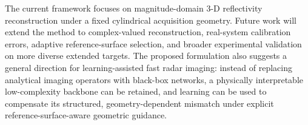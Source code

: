 \documentclass[journal]{IEEEtran}
\begin{document}
The current framework focuses on magnitude-domain 3-D reflectivity reconstruction under a fixed cylindrical acquisition geometry. Future work will extend the method to complex-valued reconstruction, real-system calibration errors, adaptive reference-surface selection, and broader experimental validation on more diverse extended targets. The proposed formulation also suggests a general direction for learning-assisted fast radar imaging: instead of replacing analytical imaging operators with black-box networks, a physically interpretable low-complexity backbone can be retained, and learning can be used to compensate its structured, geometry-dependent mismatch under explicit reference-surface-aware geometric guidance.



\end{document}
